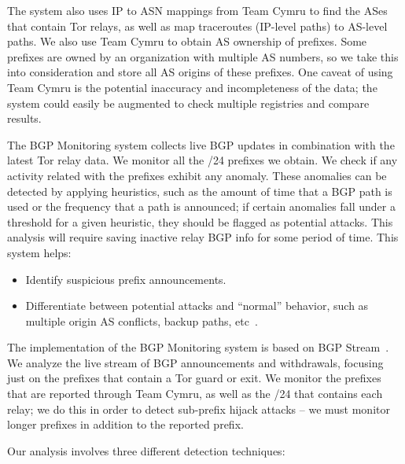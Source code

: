 The system also uses IP to ASN mappings from Team Cymru \cite{teamcymru} to find the ASes that contain Tor relays, as well as map traceroutes (IP-level paths) to AS-level paths. We also use Team Cymru \cite{teamcymru} to obtain AS ownership of prefixes. Some prefixes are owned by an organization with multiple AS numbers, so we take this into consideration and store all AS origins of these prefixes.  One caveat of using Team Cymru is the potential inaccuracy and incompleteness of the data; the system could easily be augmented to check multiple registries and compare results.

The BGP Monitoring system collects live BGP updates in combination with the latest Tor relay data. We monitor all the /24 prefixes we obtain. We check if any activity related with the prefixes exhibit any anomaly. These anomalies can be detected by applying heuristics, such as the amount of time that a BGP path is used or the frequency that a path is announced; if certain anomalies fall under a threshold for a given heuristic, they should be flagged as potential attacks. This analysis will require saving inactive relay BGP info for some period of time.  This system helps:

\begin{itemize}
\item Identify suspicious prefix announcements.
\item Differentiate between potential attacks and ``normal'' behavior, such as multiple origin AS conflicts, backup paths, etc~\cite{zhao2001analysis}.
\end{itemize}

The implementation of the BGP Monitoring system is based on BGP Stream~\cite{bgpstream}.  We analyze the live stream of BGP announcements and withdrawals, focusing just on the prefixes that contain a Tor guard or exit.  We monitor the prefixes that are reported through Team Cymru, as well as the /24 that contains each relay; we do this in order to detect sub-prefix hijack attacks -- we must monitor longer prefixes in addition to the reported prefix.  

Our analysis involves three different detection techniques:

